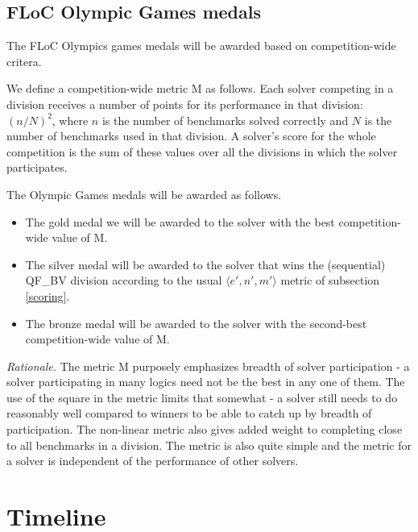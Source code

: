 \documentclass[12pt]{article}
\begin{document}
\subsection{FLoC Olympic Games medals}

The FLoC Olympics games medals will be awarded based on competition-wide critera.

We define a competition-wide metric M as follows. Each solver competing in a division receives a number of points for its performance in that division: $(n/N)^2$, where $n$ is the number of benchmarks solved correctly and $N$ is the number of benchmarks used in that division. A solver's score for the whole competition is the sum of these values over all the 
divisions in which the solver participates.

The Olympic Games medals will be awarded as follows.
\begin{itemize}
\item The gold medal we will be awarded to the solver with the best competition-wide value of M.
\item The silver medal will be awarded to the solver that wins the (sequential) QF\_BV division according to the usual $\langle e',n',m'\rangle$ metric of subsection \ref{scoring}.
\item The bronze medal will be awarded to the solver with the second-best  competition-wide value of M.
\end{itemize}

{\em Rationale.} The metric M purposely emphasizes breadth of solver participation - a solver participating in many logics need not be the best in any one of them. The use of the square in the metric limits that somewhat - a solver still needs to do reasonably well compared to winners to be able to catch up by breadth of participation. The non-linear metric also gives added weight to completing close to all benchmarks in a division. The metric is also quite simple and the metric for a solver is independent of the performance of other solvers.


\section{Timeline}
\label{sec:timeline}
\end{document}
